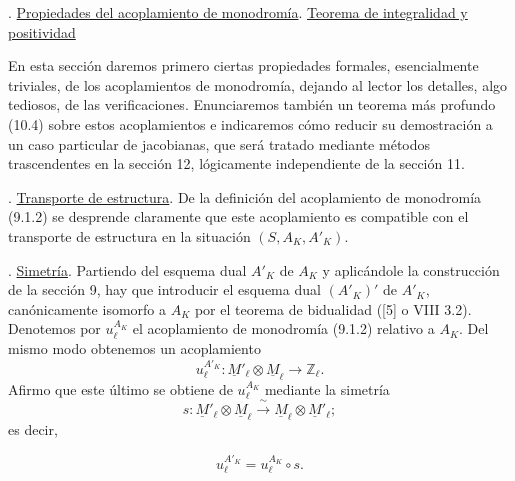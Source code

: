 
\medskip
{}. \underline{Propiedades del acoplamiento de monodromía}.
\underline{Teorema de integralidad y positividad}

En esta sección daremos primero ciertas propiedades formales,
esencialmente triviales, de los acoplamientos de monodromía, dejando al
lector los detalles, algo tediosos, de las verificaciones. Enunciaremos
también un teorema más profundo (10.4) sobre estos acoplamientos e
indicaremos cómo reducir su demostración a un caso particular de
jacobianas, que será tratado mediante métodos trascendentes en la
sección 12, lógicamente independiente de la sección 11.

\medskip
{}. \underline{Transporte de estructura}. De la definición del
acoplamiento de monodromía (9.1.2) se desprende claramente que este
acoplamiento es compatible con el transporte de estructura en la
situación $(S,A_K,A'_K)$.

\medskip
{}. \underline{Simetría}. Partiendo del esquema dual $A'_K$ de
$A_K$ y aplicándole la construcción de la sección 9, hay que introducir
el esquema dual $(A'_K)'$ de $A'_K$, canónicamente isomorfo a $A_K$
por el teorema de bidualidad ([5] o VIII 3.2). Denotemos por
$u_\ell^{A_K}$ el acoplamiento de monodromía (9.1.2) relativo a $A_K$.
Del mismo modo obtenemos un acoplamiento
\begin{equation}\tag{10.2.1}
u_\ell^{A'_K}:\underline M'_\ell\otimes\underline M_\ell
 \longrightarrow\mathbb Z_\ell.
\end{equation}
Afirmo que este último se obtiene de $u_\ell^{A_K}$ mediante la
simetría
\begin{equation*}
s:\underline M'_\ell\otimes\underline M_\ell
 \xrightarrow{\ \sim\ }
 \underline M_\ell\otimes\underline M'_\ell;
\end{equation*}
es decir,


\begin{equation}\tag{10.2.2}
u_\ell^{A'_K}=u_\ell^{A_K}\circ s.
\end{equation}

